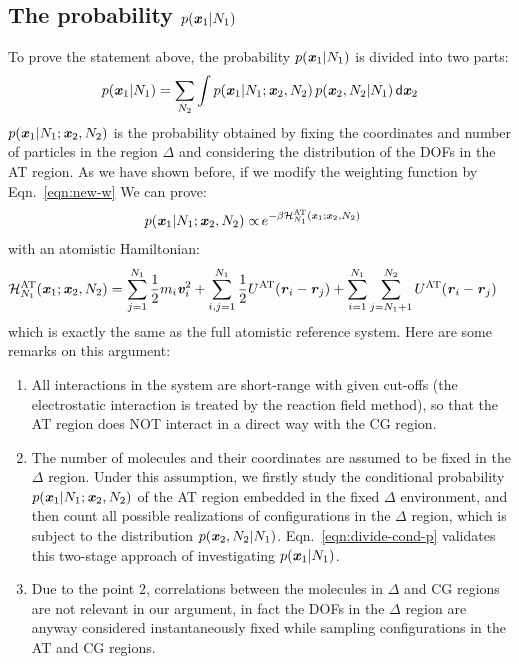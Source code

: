 \documentclass[aip,jcp,a4paper,reprint,onecolumn]{revtex4-1}
\newcommand{\vect}[1]{\textbf{\textit{#1}}}
\newcommand{\dd}[1]{\textsf{#1}}
\newcommand{\AT}{{\textrm{{AT}}}}
\newcommand{\HY}{{\Delta}}
\begin{document}
\subsection{The probability $p(\vect x_1 | N_1)$}
To prove the statement above, the probability $p(\vect x_1 | N_1)$ is divided into two parts:
\begin{align}\label{eqn:divide-cond-p}
  p(\vect x_1 | N_1) = \sum_{N_2}\int
  p(\vect x_1 | N_1; \vect x_2, N_2) \,
  p(\vect x_2, N_2 | N_1)
  \,\dd d\vect x_2
\end{align}
$p(\vect x_1 | N_1; \vect x_2, N_2)$ is the probability obtained by fixing the
coordinates and number of particles in the region $\HY$ and considering
the distribution of the DOFs in the AT region. As we have shown before,
if we modify the weighting function by Eqn.~\eqref{eqn:new-w}
We can prove:
\begin{align}
  p(\vect x_1 | N_1; \vect x_2, N_2)
  \propto &\,
  e^{-\beta\mathcal H_{N_1}^{\AT}(\vect x_1; \vect x_2, N_2)}
\end{align}
with an atomistic Hamiltonian:
\begin{align}
  \mathcal H_{N_1}^{{\AT}}(\vect x_1; \vect x_2, N_2) = &\,
  \sum_{j=1}^{N_1}\frac12 m_i\vect v_i^2 + 
  \sum_{i,j=1}^{N_1}\frac12 U^{{\AT}}(\vect r_i - \vect r_j)  +
  \sum_{i=1}^{N_1}\sum_{j=N_1+1}^{N_2} U^{{\AT}}(\vect r_i - \vect r_j)   
\end{align}
which is exactly the same as the full atomistic reference system.
Here are some remarks on this argument:
\begin{enumerate}\itemsep -1pt
\item All interactions in the system are short-range with given cut-offs (the
  electrostatic interaction is treated by the reaction field method),
  so that the AT region does NOT interact in a direct way with the CG region.
\item The number of molecules and their coordinates are assumed to be
  fixed in the $\HY$ region.  Under this assumption, we firstly study
  the conditional probability $p(\vect x_1 | N_1; \vect x_2, N_2)$ of
  the AT region embedded in the fixed $\HY$ environment, and then count
  all possible realizations of configurations in the $\HY$ region, which is subject to
  the distribution $p(\vect x_2, N_2 | N_1)$.
  Eqn.~\eqref{eqn:divide-cond-p} validates this two-stage approach of
  investigating $p(\vect x_1 | N_1)$.
\item Due to the point 2, correlations between the molecules
  in $\HY$ and CG regions are not relevant in our argument, in fact
  the DOFs in the $\HY$ region are anyway considered instantaneously fixed while sampling configurations in the AT and CG regions.
\end{enumerate}
\end{document}
